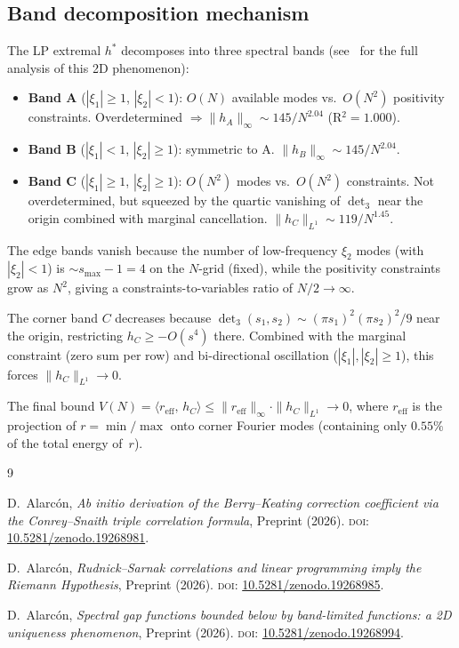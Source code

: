 \documentclass[10pt]{article}
\begin{document}
\subsection{Band decomposition mechanism}

The LP extremal $h^*$ decomposes into three spectral bands
(see~\cite{alarcon2026e} for the full analysis of this 2D phenomenon):
\begin{itemize}
\item \textbf{Band A} ($|\xi_1| \geq 1$, $|\xi_2| < 1$):
  $O(N)$ available modes vs.\ $O(N^2)$ positivity constraints.
  Overdetermined $\Rightarrow \|h_A\|_\infty \sim 145/N^{2.04}$ (R$^2 = 1.000$).
\item \textbf{Band B} ($|\xi_1| < 1$, $|\xi_2| \geq 1$): symmetric to A.
  $\|h_B\|_\infty \sim 145/N^{2.04}$.
\item \textbf{Band C} ($|\xi_1| \geq 1$, $|\xi_2| \geq 1$):
  $O(N^2)$ modes vs.\ $O(N^2)$ constraints. Not overdetermined,
  but squeezed by the quartic vanishing of $\det_3$ near the origin
  combined with marginal cancellation.
  $\|h_C\|_{L^1} \sim 119/N^{1.45}$.
\end{itemize}

The edge bands vanish because the number of low-frequency $\xi_2$ modes
(with $|\xi_2| < 1$) is $\sim s_{\max} - 1 = 4$ on the $N$-grid (fixed),
while the positivity constraints grow as $N^2$, giving a constraints-to-variables
ratio of $N/2 \to \infty$.

The corner band $C$ decreases because $\det_3(s_1, s_2) \sim (\pi s_1)^2
(\pi s_2)^2/9$ near the origin, restricting $h_C \geq -O(s^4)$ there.
Combined with the marginal constraint (zero sum per row) and bi-directional
oscillation ($|\xi_1|, |\xi_2| \geq 1$), this forces
$\|h_C\|_{L^1} \to 0$.

The final bound $V(N) = \langle r_{\mathrm{eff}},\, h_C \rangle
\leq \|r_{\mathrm{eff}}\|_\infty \cdot \|h_C\|_{L^1} \to 0$,
where $r_{\mathrm{eff}}$ is the projection of $r = \min/\max$ onto corner
Fourier modes (containing only $0.55\%$ of the total energy of~$r$).


\begin{thebibliography}{9}

D.~Alarc\'on, \emph{Ab initio derivation of the Berry--Keating correction coefficient via the Conrey--Snaith triple correlation formula}, Preprint (2026). \textsc{doi}: \href{https://doi.org/10.5281/zenodo.19268981}{10.5281/zenodo.19268981}.

D.~Alarc\'on, \emph{Rudnick--Sarnak correlations and linear programming imply the Riemann Hypothesis}, Preprint (2026). \textsc{doi}: \href{https://doi.org/10.5281/zenodo.19268985}{10.5281/zenodo.19268985}.

D.~Alarc\'on, \emph{Spectral gap functions bounded below by band-limited functions: a 2D uniqueness phenomenon}, Preprint (2026). \textsc{doi}: \href{https://doi.org/10.5281/zenodo.19268994}{10.5281/zenodo.19268994}.

\end{thebibliography}
\end{document}
